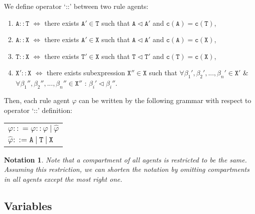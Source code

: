 \documentclass{entcs}
\renewcommand{\~}[0]{\texttildelow}
\newtheorem{notation}[thm]{Notation}
\begin{document}
\begin{defn}
We define operator `::' between two rule agents:

\begin{enumerate}
 \item $\mathtt{A}::\mathtt{T}$ $\Leftrightarrow$ there exists $\mathtt{A}' \in \mathtt{T}$ such that $\mathtt{A} \lhd \mathtt{A}'$ and $\mathtt{c}(\mathtt{A}) = \mathtt{c}(\mathtt{T})$,

\item $\mathtt{A}::\mathtt{X}$ $\Leftrightarrow$ there exists $\mathtt{A}' \in \mathtt{X}$ such that $\mathtt{A} \lhd \mathtt{A}'$ and $\mathtt{c}(\mathtt{A}) = \mathtt{c}(\mathtt{X})$,

\item $\mathtt{T}::\mathtt{X}$ $\Leftrightarrow$ there exists $\mathtt{T}' \in \mathtt{X}$ such that $\mathtt{T} \lhd \mathtt{T}'$ and $\mathtt{c}(\mathtt{T}) = \mathtt{c}(\mathtt{X})$,

\item $\mathtt{X}'::\mathtt{X}$ $\Leftrightarrow$ there exists subexpression $\mathtt{X}'' \in \mathtt{X}$ such that $\forall \beta_1', \beta_2', ..., \beta_n' \in \mathtt{X}' $ \& $\forall \beta_1'', \beta_2'', ..., \beta_n'' \in \mathtt{X}''$ : $\beta_i' \lhd \beta_i''$.

\end{enumerate}
\end{defn}

Then, each rule agent $\varphi$ can be written by the following grammar with respect to operator `::' definition:

\begin{center}
{\small
\hspace*{-1cm}\begin{tabular}{ l }
$\varphi :: = \varphi :: \varphi~|~\widehat{\varphi}$\\
$\widehat{\varphi} ::= \mathtt{A}~|~\mathtt{T}~|~\mathtt{X}$\\
\end{tabular}
}
\end{center}

\begin{notation}
Note that a compartment of all agents is restricted to be the same. Assuming this restriction, we can shorten the notation by omitting compartments in all agents except the most right one.
\end{notation}

\subsection{Variables}
\end{document}
